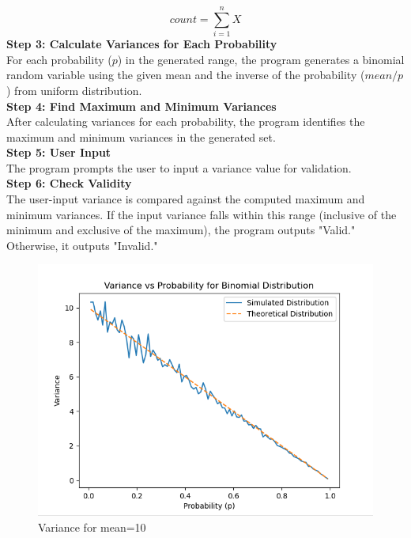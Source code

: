 \documentclass[journal,12pt,twocolumn]{IEEEtran}
\begin{document}
\[
count= \sum_{i=1}^{n} X
\]
\textbf{Step 3: Calculate Variances for Each Probability}\\
For each probability (\(p\)) in the generated range, the program generates a binomial random variable using the given mean and the inverse of the probability (\(mean/p\)) from uniform distribution.\\
\textbf{Step 4: Find Maximum and Minimum Variances}\\
After calculating variances for each probability, the program identifies the maximum and minimum variances in the generated set.\\
\textbf{Step 5: User Input}\\
The program prompts the user to input a variance value for validation.
\\
\textbf{Step 6: Check Validity}\\
The user-input variance is compared against the computed maximum and minimum variances. If the input variance falls within this range (inclusive of the minimum and exclusive of the maximum), the program outputs "Valid." Otherwise, it outputs "Invalid."
\begin{figure}[ht!]
    \centering
    \includegraphics[width=\columnwidth]{./codes/ss10.png}
    \caption{Variance for mean=10}
    \label{fig:ss10}
\end{figure}

	

	
\end{document}
